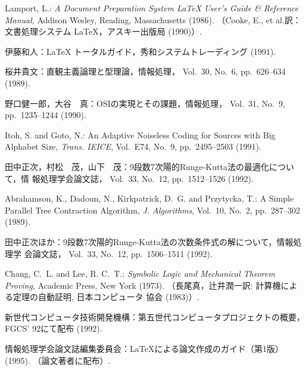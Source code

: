 \begin{thebibliography}{10}

Lamport, L.: {\em A Document Preparation System {\LaTeX} User's Guide \&
  Reference Manual}, Addison Wesley, Reading, Massachusetts (1986).
\newblock （Cooke, E., et al.訳：文書処理システム {\LaTeX}，アスキー出版局
  (1990)）.

伊藤和人：{\LaTeX} トータルガイド，秀和システムトレーディング (1991).

桜井貴文：直観主義論理と型理論，情報処理， Vol.~30, No.~6, pp.\ 626--634
  (1989).

野口健一郎，大谷　真：OSIの実現とその課題，情報処理， Vol.~31, No.~9, pp.\
  1235--1244 (1990).

Itoh, S. and Goto, N.: An Adaptive Noiseless Coding for Sources with Big
  Alphabet Size, {\em Trans. IEICE},  Vol.~E74, No.~9, pp.\ 2495--2503 (1991).

田中{正次}，村松　茂，山下　茂：9段数7次陽的Runge-Kutta法の最適化について，情%
報処理学会論文誌， Vol.~33, No.~12, pp.\ 1512--1526 (1992).

Abrahamson, K., Dadoun, N., Kirkpatrick, D.~G. and Przytycka, T.: A Simple
  Parallel Tree Contraction Algorithm, {\em J. Algorithms},  Vol.~10, No.~2,
  pp.\ 287--302 (1989).

田中{正次}ほか：9段数7次陽的Runge-Kutta法の次数条件式の解について，情報処理学%
会論文誌， Vol.~33, No.~12, pp.\ 1506--1511 (1992).

Chang, C.~L. and Lee, R. C.~T.: {\em Symbolic Logic and Mechanical Theorem
  Proving}, Academic Press, New York (1973).
\newblock （長尾真，辻井潤一訳: 計算機による定理の自動証明, 日本コンピュータ%
  協会 (1983)）.

新世代コンピュータ技術開発機構：第五世代コンピュータプロジェクトの概要，{FGCS'%
92}にて配布 (1992).

情報処理学会論文誌編集委員会：{\LaTeX}による論文作成のガイド（第1版） (1995).
\newblock （論文著者に配布）.

\end{thebibliography}

